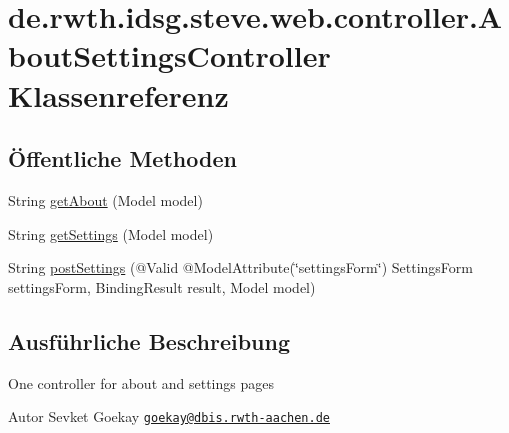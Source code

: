 \hypertarget{classde_1_1rwth_1_1idsg_1_1steve_1_1web_1_1controller_1_1_about_settings_controller}{\section{de.\-rwth.\-idsg.\-steve.\-web.\-controller.\-About\-Settings\-Controller Klassenreferenz}
\label{classde_1_1rwth_1_1idsg_1_1steve_1_1web_1_1controller_1_1_about_settings_controller}
}
\subsection*{Öffentliche Methoden}
\begin{DoxyCompactItemize}
\item 
String \hyperlink{classde_1_1rwth_1_1idsg_1_1steve_1_1web_1_1controller_1_1_about_settings_controller_a73d0aa24d33868d8b9a3b934eebd32c0}{get\-About} (Model model)
\item 
String \hyperlink{classde_1_1rwth_1_1idsg_1_1steve_1_1web_1_1controller_1_1_about_settings_controller_ae291e17dd042aa781b1b36647831add8}{get\-Settings} (Model model)
\item 
String \hyperlink{classde_1_1rwth_1_1idsg_1_1steve_1_1web_1_1controller_1_1_about_settings_controller_a0068aebf20ab8f5185e5eb352e890880}{post\-Settings} (@Valid @Model\-Attribute(\char`\"{}settings\-Form\char`\"{}) Settings\-Form settings\-Form, Binding\-Result result, Model model)
\end{DoxyCompactItemize}


\subsection{Ausführliche Beschreibung}
One controller for about and settings pages

\begin{DoxyAuthor}{Autor}
Sevket Goekay \href{mailto:goekay@dbis.rwth-aachen.de}{\tt goekay@dbis.\-rwth-\/aachen.\-de} 
\end{DoxyAuthor}


